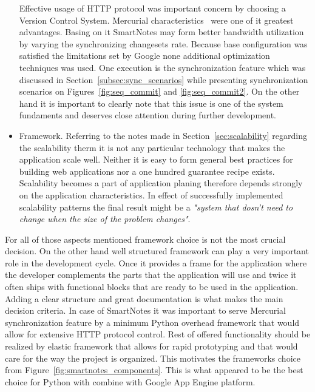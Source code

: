 \begin{itemize}
{Effective usage of HTTP protocol was important concern by choosing a Version Control System. Mercurial characteristics~\cite{google_hg_git_compare} were one of it greatest advantages. Basing on it SmartNotes may form better bandwidth utilization by varying the synchronizing changesets rate. Because base configuration was satisfied the limitations set by Google none additional optimization techniques was used. One execution is the synchronization feature which was discussed in Section~\ref{subsec:sync_scenarios} while presenting synchronization scenarios on Figures~\ref{fig:seq_commit} and \ref{fig:seq_commit2}. On the other hand it is important to clearly note that this issue is one of the system fundaments and deserves close attention during further development.}
\item{Framework. Referring to the notes made in Section~\ref{sec:scalability} regarding the scalability therm it is not any particular technology that makes the application scale well. Neither it is easy to form general best practices for building web applications nor a one hundred guarantee recipe exists. Scalability becomes a part of application planing therefore depends strongly on the application characteristics. In effect of successfully implemented scalability patterns the final result might be a \textit{"system that dosn't need to change when the size of the problem changes"}\cite{mike_malone_quote}.}   
\end{itemize}

For all of those aspects mentioned framework choice is not the most crucial decision. On the other hand well structured framework can play a very important role in the development cycle. Once it provides a frame for the application where the developer complements the parts that the application will use and twice it often ships with functional blocks that are ready to be used in the application. Adding a clear structure and great documentation is what makes the main decision criteria. In case of SmartNotes it was important to serve Mercurial synchronization feature by a minimum Python overhead framework that would allow for extensive HTTP protocol control. Rest of offered functionality should be realized by elastic framework that allows for rapid prototyping and that would care for the way the project is organized. This motivates the frameworks choice from Figure~\ref{fig:smartnotes_components}. This is what appeared to be the best choice for Python with combine with Google App Engine platform.    

